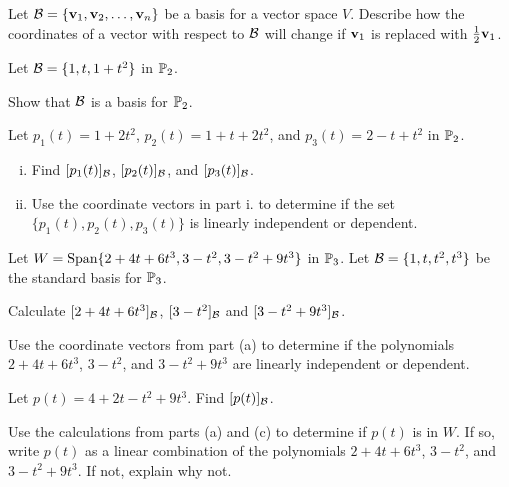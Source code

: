 \item Let $\mathcal{B}=\{ \mathbf{v}_1, \mathbf{v}_2, \ldots, \mathbf{v}_n\}$ be a basis for a vector space $V$. Describe how the coordinates of a vector with respect to $\mathcal{B}$ will change if $\mathbf{v}_1$ is replaced with $\frac{1}{2}\mathbf{v}_1$.

\item Let $\mathcal{B} = \{1, t, 1+t^2\}$ in $\mathbb{P}_2$.
	\ba
	\item Show that $\mathcal{B}$ is a basis for $\mathbb{P}_2$.
	\item Let $p_1(t) = 1+2t^2$, $p_2(t)=1+t+2t^2$, and $p_3(t) = 2-t+t^2$ in $\mathbb{P}_2$. 
		\begin{enumerate}[i.]
		\item Find $[p_1(t)]_{\mathcal{B}}$, $[p_2(t)]_{\mathcal{B}}$, and $[p_3(t)]_{\mathcal{B}}$. 
		\item Use the coordinate vectors in part i. to determine if the set $\{p_1(t), p_2(t), p_3(t)\}$ is linearly independent or dependent.
		\end{enumerate}
	\ea

\item Let $W = \text{Span}\{2+4t+6t^3, 3-t^2, 3-t^2+9t^3\}$ in $\mathbb{P}_3$. Let $\mathcal{B} = \{1, t, t^2, t^3\}$ be the standard basis for $\mathbb{P}_3$. 
	\ba
	\item Calculate $[2+4t+6t^3]_{\mathcal{B}}$, $[3-t^2]_{\mathcal{B}}$ and $[3-t^2+9t^3]_{\mathcal{B}}$. 
	\item Use the coordinate vectors from part (a) to determine if the polynomials $2+4t+6t^3$, $3-t^2$, and $3-t^2+9t^3$ are linearly independent or dependent.  
	\item Let $p(t) = 4+2t-t^2+9t^3$. Find $[p(t)]_{\mathcal{B}}$. 
	\item Use the calculations from parts (a) and (c) to determine if $p(t)$ is in $W$. If so, write $p(t)$ as a linear combination of the polynomials  $2+4t+6t^3$, $3-t^2$, and $3-t^2+9t^3$. If not, explain why not.
	\ea
	
